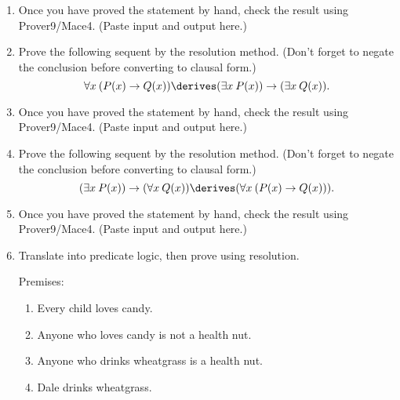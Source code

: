 \documentclass{cs81-homework}
\begin{document}
\begin{enumerate}
\item[]  Once you have proved the statement by hand, check the result
  using Prover9/Mace4.  (Paste input and output here.)

  \begin{solution}
  \end{solution}
  
\item {} Prove the following sequent by the resolution method.  (Don't
  forget to negate the conclusion before converting to clausal form.)
  \[
    \forall x \: (P(x) \to Q(x)) \derives (\exists x \: P(x)) \to (\exists x \:
    Q(x)).
  \]

  \begin{solution}
  \end{solution}
  
\item[]  Once you have proved the statement by hand, check the result
  using Prover9/Mace4.  (Paste input and output here.)

  \begin{solution}
  \end{solution}
  
\item {} Prove the following sequent by the resolution method.  (Don't
  forget to negate the conclusion before converting to clausal form.)
  \[
    (\exists x \: P(x)) \to (\forall x \: Q(x)) \derives (\forall x \: (P(x) \to
    Q(x))).
  \]

  \begin{solution}
  \end{solution}
  
\item[]  Once you have proved the statement by hand, check the result using
  Prover9/Mace4.  (Paste input and output here.)

  \begin{solution}
  \end{solution}
  
\item {}
  Translate into predicate logic, then prove using resolution.
  
  Premises:
  \begin{enumerate}
  \item Every child loves candy.
  \item Anyone who loves candy is not a health nut.
  \item Anyone who drinks wheatgrass is a health nut.
  \item Dale drinks wheatgrass.
  \end{enumerate}
  

\end{enumerate}
\end{document}
